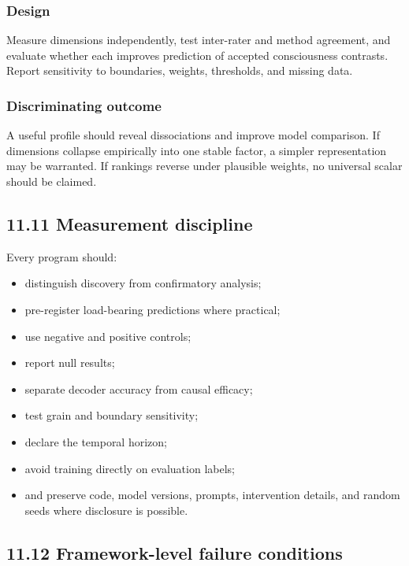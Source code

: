 \documentclass[
  11pt,
]{article}
\providecommand{\tightlist}{%
  \setlength{\itemsep}{0pt}\setlength{\parskip}{0pt}}
\begin{document}
\subsubsection{Design}\label{design-9}

Measure dimensions independently, test inter-rater and method agreement,
and evaluate whether each improves prediction of accepted consciousness
contrasts. Report sensitivity to boundaries, weights, thresholds, and
missing data.

\subsubsection{Discriminating outcome}\label{discriminating-outcome-9}

A useful profile should reveal dissociations and improve model
comparison. If dimensions collapse empirically into one stable factor, a
simpler representation may be warranted. If rankings reverse under
plausible weights, no universal scalar should be claimed.

\subsection{11.11 Measurement discipline}\label{measurement-discipline}

Every program should:

\begin{itemize}
\tightlist
\item
  distinguish discovery from confirmatory analysis;
\item
  pre-register load-bearing predictions where practical;
\item
  use negative and positive controls;
\item
  report null results;
\item
  separate decoder accuracy from causal efficacy;
\item
  test grain and boundary sensitivity;
\item
  declare the temporal horizon;
\item
  avoid training directly on evaluation labels;
\item
  and preserve code, model versions, prompts, intervention details, and
  random seeds where disclosure is possible.
\end{itemize}

\subsection{11.12 Framework-level failure
conditions}\label{framework-level-failure-conditions}
\end{document}
